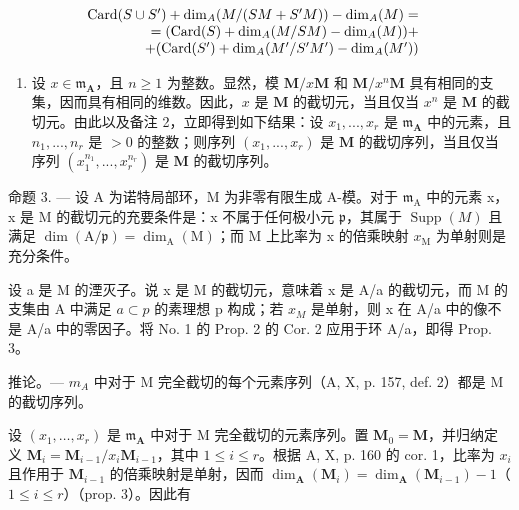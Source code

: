 \[
\begin{array}{r l} \operatorname{Card} (S \cup S ^ {\prime}) + \dim_ {A} (M / (S M + S ^ {\prime} M)) - \dim_ {A} (M) = & \\ = (\operatorname{Card} (S) + \dim_ {A} (M / S M) - \dim_ {A} (M)) + & \\ + (\operatorname{Card} (S ^ {\prime}) + \dim_ {A} (M ^ {\prime} / S ^ {\prime} M ^ {\prime}) - \dim_ {A} (M ^ {\prime})) \end{array}
\]

\begin{enumerate}
\def\labelenumi{\arabic{enumi})}
\setcounter{enumi}{2}
\tightlist
\item
  设 \(x \in \mathfrak{m}_{\mathbf{A}}\)，且 \(n \geqslant 1\) 为整数。显然，模 \(\mathbf{M} / x\mathbf{M}\) 和 \(\mathbf{M} / x^n\mathbf{M}\) 具有相同的支集，因而具有相同的维数。因此，\(x\) 是 \(\mathbf{M}\) 的截切元，当且仅当 \(x^n\) 是 \(\mathbf{M}\) 的截切元。由此以及备注 2，立即得到如下结果：设 \(x_1, ..., x_r\) 是 \(\mathfrak{m}_{\mathbf{A}}\) 中的元素，且 \(n_1, ..., n_r\) 是 \(> 0\) 的整数；则序列 \((x_1, ..., x_r)\) 是 \(\mathbf{M}\) 的截切序列，当且仅当序列 \((x_1^{n_1}, ..., x_r^{n_r})\) 是 \(\mathbf{M}\) 的截切序列。
\end{enumerate}

命题 3. --- 设 A 为诺特局部环，M 为非零有限生成 A-模。对于 \(\mathfrak{m}_{\mathrm{A}}\) 中的元素 x，x 是 M 的截切元的充要条件是：x 不属于任何极小元 \(\mathfrak{p}\)，其属于 \(\operatorname{Supp}(M)\) 且满足 \(\dim(\mathrm{A}/\mathfrak{p}) = \dim_{\mathrm{A}}(\mathrm{M})\)；而 M 上比率为 x 的倍乘映射 \(x_{\mathrm{M}}\) 为单射则是充分条件。

设 a 是 M 的湮灭子。说 x 是 M 的截切元，意味着 x 是 A/a 的截切元，而 M 的支集由 A 中满足 \(a \subset p\) 的素理想 p 构成；若 \(x_{M}\) 是单射，则 x 在 A/a 中的像不是 A/a 中的零因子。将 No. 1 的 Prop. 2 的 Cor. 2 应用于环 A/a，即得 Prop. 3。

推论。--- \(m_{A}\) 中对于 M 完全截切的每个元素序列（A, X, p. 157, def. 2）都是 M 的截切序列。

设 \((x_{1},\ldots ,x_{r})\) 是 \(\mathfrak{m}_{\mathbf{A}}\) 中对于 M 完全截切的元素序列。置 \(\mathbf{M}_0 = \mathbf{M}\)，并归纳定义 \(\mathbf{M}_i = \mathbf{M}_{i - 1} / x_i\mathbf{M}_{i - 1}\)，其中 \(1\leqslant i\leqslant r\)。根据 A, X, p. 160 的 cor. 1，比率为 \(x_{i}\) 且作用于 \(\mathbf{M}_{i - 1}\) 的倍乘映射是单射，因而 \(\dim_{\mathbf{A}}(\mathbf{M}_i) = \dim_{\mathbf{A}}(\mathbf{M}_{i - 1}) - 1\)（\(1\leqslant i\leqslant r\)）（prop. 3）。因此有

